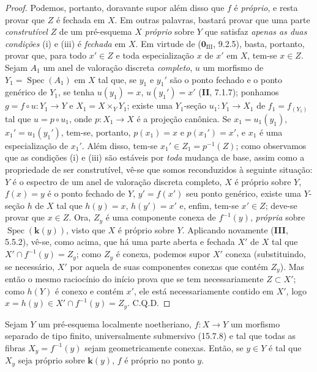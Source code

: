 \begin{proof}
Podemos, portanto, doravante supor além disso que $f$ é \emph{próprio}, e resta provar que $Z$ é fechada em $X$. Em outras palavras, bastará provar que uma parte \emph{construtível} $Z$ de um pré-esquema $X$ \emph{próprio} sobre $Y$ que satisfaz \emph{apenas as duas condições} (i) e (iii) é \emph{fechada} em $X$. Em virtude de ($\mathbf{0}_{\mathrm{III}}$, 9.2.5), basta, portanto, provar que, para todo $x'\in Z$ e toda especialização $x$ de $x'$ em $X$, tem-se $x\in Z$. Sejam $A_1$ um anel de valoração discreta \emph{completo}, $u$ um morfismo de $Y_1=\operatorname{Spec}(A_1)$ em $X$ tal que, se $y_1$ e $y_1'$ são o ponto fechado e o ponto genérico de $Y_1$, se tenha $u(y_1)=x$, $u(y_1')=x'$ (\textbf{II}, 7.1.7); ponhamos $g=f\circ u:Y_1\to Y$ e $X_1=X\times_Y Y_1$; existe uma $Y_1$-seção $u_1:Y_1\to X_1$ de $f_1=f_{(Y_1)}$ tal que $u=p\circ u_1$, onde $p:X_1\to X$ é a projeção canônica. Se $x_1=u_1(y_1)$, $x_1'=u_1(y_1')$, tem-se, portanto, $p(x_1)=x$ e $p(x_1')=x'$, e $x_1$ é uma especialização de $x_1'$. Além disso, tem-se $x_1'\in Z_1=p^{-1}(Z)$; como observamos que as condições (i) e (iii) são estáveis por \emph{toda} mudança de base, assim como a propriedade de ser construtível, vê-se que somos reconduzidos à seguinte situação: $Y$ é o espectro de um anel de valoração discreta completo, $X$ é próprio sobre $Y$, $f(x)=y$ é o ponto fechado de $Y$, $y'=f(x')$ seu ponto genérico, existe uma $Y$-seção $h$ de $X$ tal que $h(y)=x$, $h(y')=x'$ e, enfim, tem-se $x'\in Z$; deve-se provar que $x\in Z$. Ora, $Z_y$ é uma componente conexa de $f^{-1}(y)$, \emph{própria} sobre $\operatorname{Spec}(\mathbf k(y))$, visto que $X$ é próprio sobre $Y$. Aplicando novamente (\textbf{III}, 5.5.2), vê-se, como acima, que há uma parte aberta e fechada $X'$ de $X$ tal que $X'\cap f^{-1}(y)=Z_y$; como $Z_y$ é conexa,
podemos supor $X'$ conexa (substituindo, se necessário, $X'$ por aquela de suas componentes conexas que contém $Z_y$). Mas então o mesmo raciocínio do início prova que se tem necessariamente $Z\subset X'$; como $h(Y)$ é conexo e contém $x'$, ele está necessariamente contido em $X'$, logo $x=h(y)\in X'\cap f^{-1}(y)=Z_y$. C.Q.D.
\end{proof}

\begin{corollary}[15.7.10]
\label{IV.15.7.10}
Sejam $Y$ um pré-esquema localmente noetheriano, $f:X\to Y$ um morfismo separado de tipo finito, universalmente submersivo (15.7.8) e tal que todas as fibras $X_y=f^{-1}(y)$ sejam geometricamente conexas. Então, se $y\in Y$ é tal que $X_y$ seja próprio sobre $\mathbf k(y)$, $f$ é próprio no ponto $y$.
\end{corollary}

